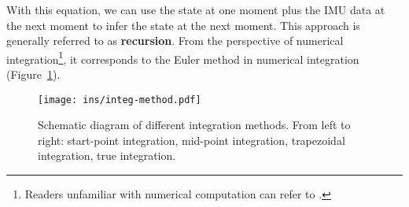 With this equation, we can use the state at one moment plus the IMU data at the next moment to infer the state at the next moment. This approach is generally referred to as \textbf{recursion}. From the perspective of numerical integration\footnote{Readers unfamiliar with numerical computation can refer to \cite{LiQinYang2001}.}, it corresponds to the Euler method in numerical integration (Figure~\ref{fig:integ-method}).

\begin{figure}
	\centering
	\texttt{[image: ins/integ-method.pdf]}
	\caption{Schematic diagram of different integration methods. From left to right: start-point integration, mid-point integration, trapezoidal integration, true integration.}
	\label{fig:integ-method}
\end{figure}

